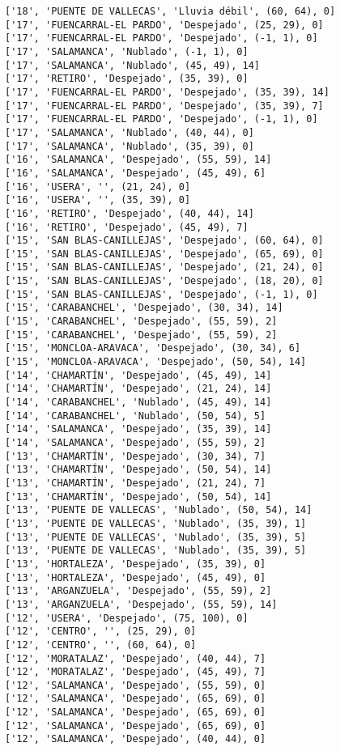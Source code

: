 \documentclass[11pt]{article}
\begin{document}
\begin{Verbatim}[commandchars=\\\{\}]
['18', 'PUENTE DE VALLECAS', 'Lluvia débil', (60, 64), 0]
['17', 'FUENCARRAL-EL PARDO', 'Despejado', (25, 29), 0]
['17', 'FUENCARRAL-EL PARDO', 'Despejado', (-1, 1), 0]
['17', 'SALAMANCA', 'Nublado', (-1, 1), 0]
['17', 'SALAMANCA', 'Nublado', (45, 49), 14]
['17', 'RETIRO', 'Despejado', (35, 39), 0]
['17', 'FUENCARRAL-EL PARDO', 'Despejado', (35, 39), 14]
['17', 'FUENCARRAL-EL PARDO', 'Despejado', (35, 39), 7]
['17', 'FUENCARRAL-EL PARDO', 'Despejado', (-1, 1), 0]
['17', 'SALAMANCA', 'Nublado', (40, 44), 0]
['17', 'SALAMANCA', 'Nublado', (35, 39), 0]
['16', 'SALAMANCA', 'Despejado', (55, 59), 14]
['16', 'SALAMANCA', 'Despejado', (45, 49), 6]
['16', 'USERA', '', (21, 24), 0]
['16', 'USERA', '', (35, 39), 0]
['16', 'RETIRO', 'Despejado', (40, 44), 14]
['16', 'RETIRO', 'Despejado', (45, 49), 7]
['15', 'SAN BLAS-CANILLEJAS', 'Despejado', (60, 64), 0]
['15', 'SAN BLAS-CANILLEJAS', 'Despejado', (65, 69), 0]
['15', 'SAN BLAS-CANILLEJAS', 'Despejado', (21, 24), 0]
['15', 'SAN BLAS-CANILLEJAS', 'Despejado', (18, 20), 0]
['15', 'SAN BLAS-CANILLEJAS', 'Despejado', (-1, 1), 0]
['15', 'CARABANCHEL', 'Despejado', (30, 34), 14]
['15', 'CARABANCHEL', 'Despejado', (55, 59), 2]
['15', 'CARABANCHEL', 'Despejado', (55, 59), 2]
['15', 'MONCLOA-ARAVACA', 'Despejado', (30, 34), 6]
['15', 'MONCLOA-ARAVACA', 'Despejado', (50, 54), 14]
['14', 'CHAMARTÍN', 'Despejado', (45, 49), 14]
['14', 'CHAMARTÍN', 'Despejado', (21, 24), 14]
['14', 'CARABANCHEL', 'Nublado', (45, 49), 14]
['14', 'CARABANCHEL', 'Nublado', (50, 54), 5]
['14', 'SALAMANCA', 'Despejado', (35, 39), 14]
['14', 'SALAMANCA', 'Despejado', (55, 59), 2]
['13', 'CHAMARTÍN', 'Despejado', (30, 34), 7]
['13', 'CHAMARTÍN', 'Despejado', (50, 54), 14]
['13', 'CHAMARTÍN', 'Despejado', (21, 24), 7]
['13', 'CHAMARTÍN', 'Despejado', (50, 54), 14]
['13', 'PUENTE DE VALLECAS', 'Nublado', (50, 54), 14]
['13', 'PUENTE DE VALLECAS', 'Nublado', (35, 39), 1]
['13', 'PUENTE DE VALLECAS', 'Nublado', (35, 39), 5]
['13', 'PUENTE DE VALLECAS', 'Nublado', (35, 39), 5]
['13', 'HORTALEZA', 'Despejado', (35, 39), 0]
['13', 'HORTALEZA', 'Despejado', (45, 49), 0]
['13', 'ARGANZUELA', 'Despejado', (55, 59), 2]
['13', 'ARGANZUELA', 'Despejado', (55, 59), 14]
['12', 'USERA', 'Despejado', (75, 100), 0]
['12', 'CENTRO', '', (25, 29), 0]
['12', 'CENTRO', '', (60, 64), 0]
['12', 'MORATALAZ', 'Despejado', (40, 44), 7]
['12', 'MORATALAZ', 'Despejado', (45, 49), 7]
['12', 'SALAMANCA', 'Despejado', (55, 59), 0]
['12', 'SALAMANCA', 'Despejado', (65, 69), 0]
['12', 'SALAMANCA', 'Despejado', (65, 69), 0]
['12', 'SALAMANCA', 'Despejado', (65, 69), 0]
['12', 'SALAMANCA', 'Despejado', (40, 44), 0]

\end{Verbatim}
\end{document}
